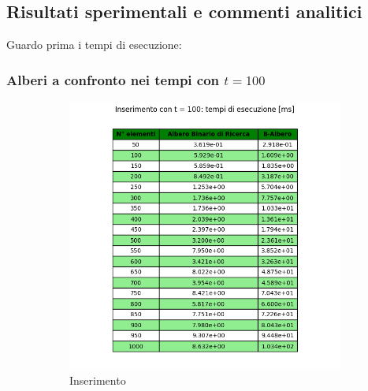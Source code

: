 \newpage
\subsection{Risultati sperimentali e commenti analitici}
\label{sec:RisultatiSperimentaliCommentiAnalitici_1}

Guardo prima i tempi di esecuzione:

\subsubsection{Alberi a confronto nei tempi con $t = 100$}

\begin{figure}[H]
    \centering
    \begin{subfigure}[b]{0.49\textwidth}
        \centering
        \includegraphics[width=\textwidth]{tables/insert-ms-t100.png}
        \caption{Inserimento}
        \label{fig:tableinserttimet100}
    \end{subfigure}
    \hfill
    \begin{subfigure}[b]{0.49\textwidth}
        \centering

\end{subfigure}
\end{figure}
